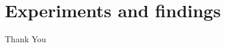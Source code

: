 \documentclass[dvipsnames]{beamer}
\begin{document}

\section{Experiments and findings}

\begin{frame}
\centering
\Huge
Thank You
\end{frame}
\end{document}
